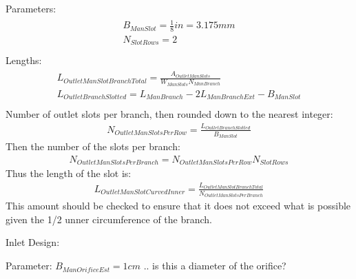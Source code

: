 \documentclass[letterpaper,10pt,english]{sphinxmanual}
\begin{document}
Parameters:
\begin{align}\label{equation:Filtration/Filtration_Derivations:Filtration/Filtration_Derivations:44}\!\begin{aligned}
B_{ManSlot} = \frac{1}{8}in = 3.175mm\\
N_{SlotRows} = 2\\
\end{aligned}\end{align}
Lengths:
\begin{align}\label{equation:Filtration/Filtration_Derivations:Filtration/Filtration_Derivations:45}\!\begin{aligned}
L_{OutletManSlotBranchTotal} = \frac{A_{OutletManSlots}}{W_{ManSlots}N_{ManBranch}}\\
L_{OutletBranchSlotted} = L_{ManBranch} - 2L_{ManBranchExt} - B_{ManSlot}\\
\end{aligned}\end{align}
Number of outlet slots per branch, then rounded down to the nearest integer:
\begin{equation}\label{equation:Filtration/Filtration_Derivations:Filtration/Filtration_Derivations:46}
\begin{split}N_{OutletManSlotsPerRow} =  \frac{L_{OutletBranchSlotted}}{B_{ManSlot}}\end{split}
\end{equation}
Then the number of the slots per branch:
\begin{equation}\label{equation:Filtration/Filtration_Derivations:Filtration/Filtration_Derivations:47}
\begin{split}N_{OutletManSlotsPerBranch} = N_{OutletManSlotsPerRow}N_{SlotRows}\end{split}
\end{equation}
Thus the length of the slot is:
\begin{equation}\label{equation:Filtration/Filtration_Derivations:Filtration/Filtration_Derivations:48}
\begin{split}L_{OutletManSlotCurvedInner} = \frac{ L_{OutletManSlotBranchTotal}}{N_{OutletManSlotsPerBranch}}\end{split}
\end{equation}
This amount should be checked to ensure that it does not exceed what is possible given the 1/2 unner circumference of the branch.

Inlet Design:

Parameter:
\(B_{ManOrificeEst} = 1cm\)
.. is this a diameter of the orifice?
\end{document}
